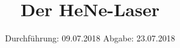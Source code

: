 

\subject{VERSUCH NUMMER 61}
\title{Der HeNe-Laser}
\date{
  Durchführung: 09.07.2018
  \hspace{3em}
  Abgabe: 23.07.2018  %
}



\thispagestyle{empty}
\maketitle
\thispagestyle{empty}
\tableofcontents
\newpage
\setcounter{page}{1}


% 




\nocite{*}
\printbibliography


